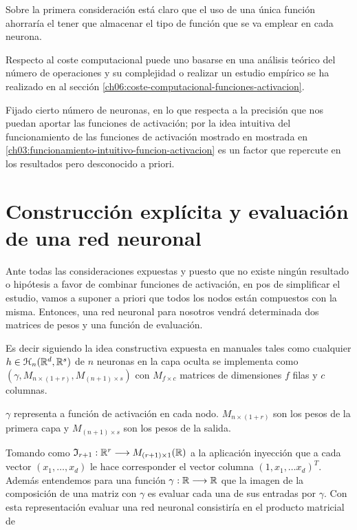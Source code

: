 Sobre la primera consideración está claro que el uso de una única función ahorraría el tener que almacenar el tipo de función que se va emplear en cada neurona.

Respecto al coste computacional puede uno basarse en una análisis teórico del número de 
operaciones y su complejidad o realizar un estudio empírico se ha realizado 
en al sección \ref{ch06:coste-computacional-funciones-activacion}.

Fijado cierto número de neuronas, en lo que respecta a la precisión que nos puedan aportar las funciones de activación; por la idea intuitiva 
del funcionamiento de las funciones de activación mostrado en mostrada en \ref{ch03:funcionamiento-intuitivo-funcion-activacion} es un factor que repercute en los resultados 
pero desconocido a priori. 



\section{Construcción explícita y evaluación de una red neuronal}

Ante todas las consideraciones expuestas y puesto que 
no existe ningún resultado o hipótesis a favor de combinar funciones de activación, en pos de simplificar el estudio, vamos a suponer a priori que todos los nodos están compuestos con la misma. Entonces,  una red neuronal para nosotros 
vendrá determinada dos matrices de pesos y una función de evaluación. 

Es decir siguiendo la idea constructiva expuesta en manuales tales como \cite{learning-from-data-1-2}
 cualquier $h \in \mathcal{H}_n(\mathbb{R}^d,\mathbb{R}^s)$ de $n$ neuronas en la capa oculta se implementa como 
$(\gamma, M_{n \times (1+r)}, M_{(n+1) \times s})$ con $M_{f \times c}$ matrices de dimensiones $f$ filas y $c$ columnas. 

$\gamma$ representa a función de activación en cada nodo. 
$M_{n \times (1+r)}$ son los pesos de la primera capa 
y $M_{(n+1) \times s}$ son los pesos de la salida. 

Tomando como $\mathfrak{I}_{r+1}: \mathbb{R}^r \longrightarrow M_{(r+1) \times 1}(\mathbb{R})$ a la aplicación inyección que a cada vector $(x_1, \ldots, x_d)$ le hace corresponder el vector columna $(1, x_1, \ldots x_d)^T.$
Además entendemos para una función $\gamma : \mathbb{R} \longrightarrow \mathbb{R}$ 
que la imagen de la composición de una matriz con $\gamma$ es evaluar cada una de sus entradas por $\gamma$. 
Con esta representación evaluar una red neuronal consistiría en el producto matricial de 

